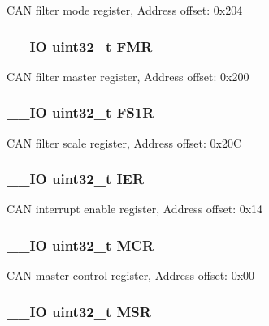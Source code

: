 C\-A\-N filter mode register, Address offset\-: 0x204 \hypertarget{struct_c_a_n___type_def_a1cb734df34f6520a7204c4c70634ebba}{
\subsubsection[{F\-M\-R}]{\setlength{\rightskip}{0pt plus 5cm}\-\_\-\-\_\-\-I\-O uint32\-\_\-t F\-M\-R}}\label{struct_c_a_n___type_def_a1cb734df34f6520a7204c4c70634ebba}
C\-A\-N filter master register, Address offset\-: 0x200 \hypertarget{struct_c_a_n___type_def_aae0256ae42106ee7f87fc7e5bdb779d4}{
\subsubsection[{F\-S1\-R}]{\setlength{\rightskip}{0pt plus 5cm}\-\_\-\-\_\-\-I\-O uint32\-\_\-t F\-S1\-R}}\label{struct_c_a_n___type_def_aae0256ae42106ee7f87fc7e5bdb779d4}
C\-A\-N filter scale register, Address offset\-: 0x20\-C \hypertarget{struct_c_a_n___type_def_a6566f8cfbd1d8aa7e8db046aa35e77db}{
\subsubsection[{I\-E\-R}]{\setlength{\rightskip}{0pt plus 5cm}\-\_\-\-\_\-\-I\-O uint32\-\_\-t I\-E\-R}}\label{struct_c_a_n___type_def_a6566f8cfbd1d8aa7e8db046aa35e77db}
C\-A\-N interrupt enable register, Address offset\-: 0x14 \hypertarget{struct_c_a_n___type_def_a27af4e9f888f0b7b1e8da7e002d98798}{
\subsubsection[{M\-C\-R}]{\setlength{\rightskip}{0pt plus 5cm}\-\_\-\-\_\-\-I\-O uint32\-\_\-t M\-C\-R}}\label{struct_c_a_n___type_def_a27af4e9f888f0b7b1e8da7e002d98798}
C\-A\-N master control register, Address offset\-: 0x00 \hypertarget{struct_c_a_n___type_def_acdd4c1b5466be103fb2bb2a225b1d3a9}{
\subsubsection[{M\-S\-R}]{\setlength{\rightskip}{0pt plus 5cm}\-\_\-\-\_\-\-I\-O uint32\-\_\-t M\-S\-R}}\label{struct_c_a_n___type_def_acdd4c1b5466be103fb2bb2a225b1d3a9}
